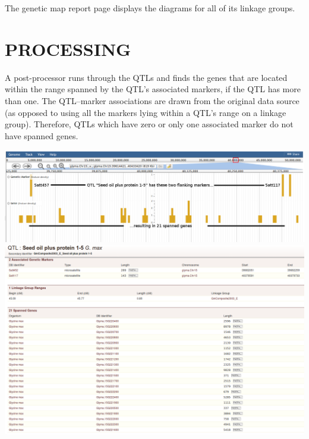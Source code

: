 \documentclass[]{pagposter}
\newlength{\figwidth}
\begin{document}
\begin{multicols*}{3}
  The genetic map report page displays the diagrams for all of its linkage groups.

  \section*{PROCESSING}

  A post-processor runs through the QTLs and finds the genes that are located within the range spanned by the QTL's associated markers, if the QTL has more than one. The QTL--marker associations
  are drawn from the original data source (as opposed to using all the markers lying within a QTL's range on a linkage group). Therefore, QTLs which have zero or only one associated marker do not have
  spanned genes.

  \begin{center}
    \includegraphics[width=\figwidth]{genetic-marker-jbrowse.png} %
    \vspace{24pt}
    \includegraphics[width=\figwidth]{QTL-report.png} %
\end{center}
\end{multicols*}
\end{document}

